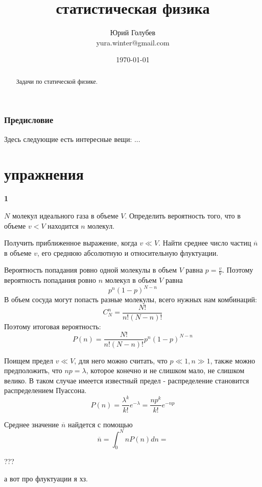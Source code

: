 \documentclass[a4paper,12pt]{article} %
\author{Юрий Голубев\\ yura.winter@gmail.com }
\title{статистическая физика}
\date{\today}
\begin{document}
\maketitle

\begin{abstract}
Задачи по статической физике.
\end{abstract}
\tableofcontents

\section*{Предисловие}

Здесь следующие есть интересные вещи:
...




\clearpage
\part{упражнения}


\begin{task}\textbf{1}

$ N $ молекул идеального газа в объеме $ V $. 
Определить вероятность того, что в объеме $v < V$ находится $ n $ молекул.

Получить приближенное выражение, когда  $v \ll V $. 
Найти среднее число частиц $\overline{n}$ в объеме $ v $, его среднюю абсолютную и относительную флуктуации.  

Вероятность попадания ровно одной молекулы в объем $ V$ равна $ p=\frac{v}{V}$. 
Поэтому вероятность попадания ровно $n$ молекул в объем $V$ равна 
\[ p^n (1-p)^{N-n} \]
В объем сосуда могут попасть разные молекулы, всего нужных нам комбинаций:
\[ C_N^n =\frac{N!}{n!(N-n)!}\]
Поэтому итоговая вероятность:
\[ P(n)=\frac{N!}{n!(N-n)!}p^n (1-p)^{N-n} \]

Поищем предел $v \ll V$,  для него можно считать, что $ p\ll 1, n\gg 1$, также можно предположить, что $ np=\lambda$, которое конечно и не слишком мало, не слишком велико.
В таком случае имеется известный предел - распределение становится распределением Пуассона.
\[ P(n)=\frac{\lambda^k}{k!}e^{-\lambda}=
\frac{np^k}{k!}e^{-np}\]

Среднее значение $\overline{n}$ найдется с помощью
\[ \overline{n}=\int_0^N n P(n) dn= \]

???

а вот про флуктуации я хз.

\end{task}
\end{document}
